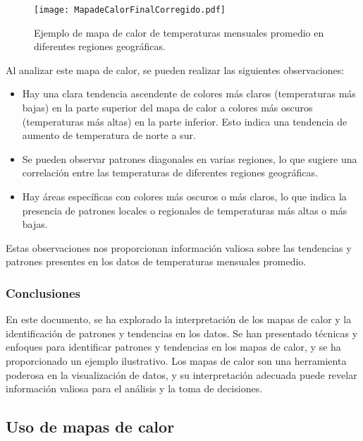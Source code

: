 \documentclass{article}
\begin{document}
\begin{figure}[htbp]
  \centering
  \texttt{[image: MapadeCalorFinalCorregido.pdf]}
  \caption{Ejemplo de mapa de calor de temperaturas mensuales promedio en diferentes regiones geográficas.}
  \label{fig:heatmap_example}
\end{figure}

Al analizar este mapa de calor, se pueden realizar las siguientes observaciones:

\begin{itemize}
  \item Hay una clara tendencia ascendente de colores más claros (temperaturas más bajas) en la parte superior del mapa de calor a colores más oscuros (temperaturas más altas) en la parte inferior. Esto indica una tendencia de aumento de temperatura de norte a sur.
  \item Se pueden observar patrones diagonales en varias regiones, lo que sugiere una correlación entre las temperaturas de diferentes regiones geográficas.
  \item Hay áreas específicas con colores más oscuros o más claros, lo que indica la presencia de patrones locales o regionales de temperaturas más altas o más bajas.
\end{itemize}

Estas observaciones nos proporcionan información valiosa sobre las tendencias y patrones presentes en los datos de temperaturas mensuales promedio.

\subsubsection*{Conclusiones}
En este documento, se ha explorado la interpretación de los mapas de calor y la identificación de patrones y tendencias en los datos. Se han presentado técnicas y enfoques para identificar patrones y tendencias en los mapas de calor, y se ha proporcionado un ejemplo ilustrativo. Los mapas de calor son una herramienta poderosa en la visualización de datos, y su interpretación adecuada puede revelar información valiosa para el análisis y la toma de decisiones.



\subsection{Uso de mapas de calor}
\end{document}
